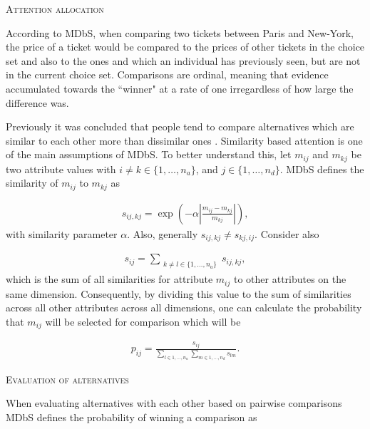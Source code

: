\documentclass[a4paper,12pt]{article}
\begin{document}
\textsc{Attention allocation}

According to MDbS, when comparing two tickets between Paris and New-York, the price of a ticket would be compared to the prices of other tickets in the choice set and also to the ones and which an individual has previously seen, but are not in the current choice set. Comparisons are ordinal, meaning that evidence accumulated towards the ``winner" at a rate of one irregardless of how large the difference was. 

Previously it was concluded that people tend to compare alternatives which are similar to each other more than dissimilar ones \citep{noguchi2014attraction}. Similarity based attention is one of the main assumptions of MDbS. To better understand this, let $m_{ij}$ and $m_{kj}$ be two attribute values with $i \neq k \in \{1, \ldots, n_a\}$, and $j \in \{1, \ldots, n_d\}$. MDbS defines the similarity of $m_{ij}$ to $m_{kj}$ as

\begin{align}\label{similarityMDBS}
s_{ij,kj} = \exp \left( - \alpha \left| \frac{m_{ij} - m_{kj}}{m_{kj}} \right| \right) ,
\end{align}
with similarity parameter $\alpha$. Also, generally $s_{ij,kj} \neq s_{kj,ij}.$ Consider also 

\begin{align}\label{sumOfSimilaritiesMDbS}
    s_{ij} = \sum_{\substack{k \neq l \in \{1, \ldots, n_a\}}} s_{ij,kj}  ,
\end{align}
which is the sum of all similarities for attribute $m_{ij}$ to other attributes on the same dimension. Consequently, by dividing this value to the sum of similarities across all other attributes across all dimensions, one can calculate the probability that $m_{ij}$ will be selected for comparison which will be 

\begin{align}\label{probabilityOfComparison}
    p_{ij} = \frac{s_{ij}}{\sum_{l \in {1, \ldots, n_a}} \sum_{m \in {1, \ldots, n_d}} s_{lm}} .
\end{align}

\textsc{Evaluation of alternatives}

When evaluating alternatives with each other based on pairwise comparisons MDbS defines the probability of winning a comparison as 
\end{document}

